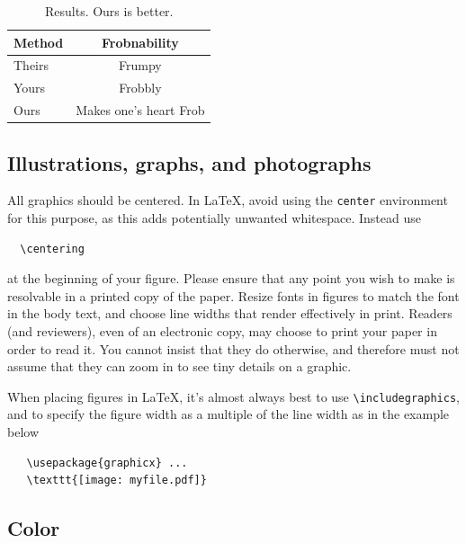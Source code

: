 \documentclass[10pt,twocolumn,letterpaper]{article}
\begin{document}

\begin{table}
  \centering
  \begin{tabular}{@{}lc@{}}
    \toprule
    Method & Frobnability \\
    \midrule
    Theirs & Frumpy \\
    Yours & Frobbly \\
    Ours & Makes one's heart Frob\\
    \bottomrule
  \end{tabular}
  \caption{Results.   Ours is better.}
  \label{tab:example}
\end{table}

\subsection{Illustrations, graphs, and photographs}

All graphics should be centered.
In \LaTeX, avoid using the \texttt{center} environment for this purpose, as this adds potentially unwanted whitespace.
Instead use
{\small\begin{verbatim}
  \centering
\end{verbatim}}
at the beginning of your figure.
Please ensure that any point you wish to make is resolvable in a printed copy of the paper.
Resize fonts in figures to match the font in the body text, and choose line widths that render effectively in print.
Readers (and reviewers), even of an electronic copy, may choose to print your paper in order to read it.
You cannot insist that they do otherwise, and therefore must not assume that they can zoom in to see tiny details on a graphic.

When placing figures in \LaTeX, it's almost always best to use \verb+\includegraphics+, and to specify the figure width as a multiple of the line width as in the example below
{\small\begin{verbatim}
   \usepackage{graphicx} ...
   \texttt{[image: myfile.pdf]}
\end{verbatim}
}


\subsection{Color}
\end{document}
